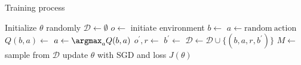 \begin{algorithm}[!t]
    \caption{Training process}\label{alg:training_process}
    \begin{algorithmic}[1]
        \State Initialize $\theta$ randomly
        \State $\mathcal{D} \gets \emptyset$
            \State $o \gets $ initiate environment
            \State $b \gets $ 
                    \State $a \gets \mathrm{random\ action}$
                \Else
                    \State $Q(b, a) \gets $
                    \State $a \gets \argmax_{a} Q(b,a)$
                \EndIf
                \State $o^\prime, r \gets $ 
                \State $b^\prime \gets $ 
                   \State $\mathcal{D} \gets \mathcal{D} \cup \{(b, a, r, b^\prime)\}$
                   \State $M \gets $ sample from $\mathcal{D}$
                   \State update $\theta$ with SGD and loss $J(\theta)$ 
            \EndWhile
        \EndFor
    \end{algorithmic}
\end{algorithm}




